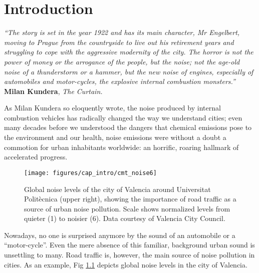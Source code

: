 \chapter{Introduction} \label{cap:intro}

\null\vspace{-10mm}
\begin{flushright}
\begin{minipage}[t]{0.66\textwidth}
{\itshape\small``The story is set in the year 1922 and has its main character, Mr Engelbert, moving to Prague from the countryside to live out his retirement years and struggling to cope with the aggressive modernity of the city. The horror is not the power of money or the arrogance of the people, but the noise; not the age-old noise of a thunderstorm or a hammer, but the new noise of engines, especially of automobiles and motor-cycles, the explosive internal combustion monsters.''}\\[-3mm]

{\cabincondensed\small\hfill \textbf{Milan Kundera}, \emph{The Curtain.}}\\[5mm]
\end{minipage}
\end{flushright}

\noindent As Milan Kundera so eloquently wrote, the noise produced by internal combustion vehicles has radically changed the way we understand cities; even many decades before we understood the dangers that chemical emissions pose to the environment and our health, noise emissions were without a doubt a commotion for urban inhabitants worldwide: an horrific, roaring hallmark of accelerated progress.

\begin{figure}[t!]
\centering
\texttt{[image: figures/cap\_intro/cmt\_noise6]}
\caption{Global noise levels of the city of Valencia around Universitat Politècnica (upper right), showing the importance of road traffic as a source of urban noise pollution. Scale shows normalized levels from quieter (1) to noisier (6). Data courtesy of Valencia City Council.}
\label{fig:noise_valencia}
\end{figure}

Nowadays, no one is surprised anymore by the sound of an automobile or a ``motor-cycle''. Even the mere absence of this familiar, background urban sound is unsettling to many. Road traffic is, however, the main source of noise pollution in cities. As an example, Fig \ref{fig:noise_valencia} depicts global noise levels in the city of Valencia.

